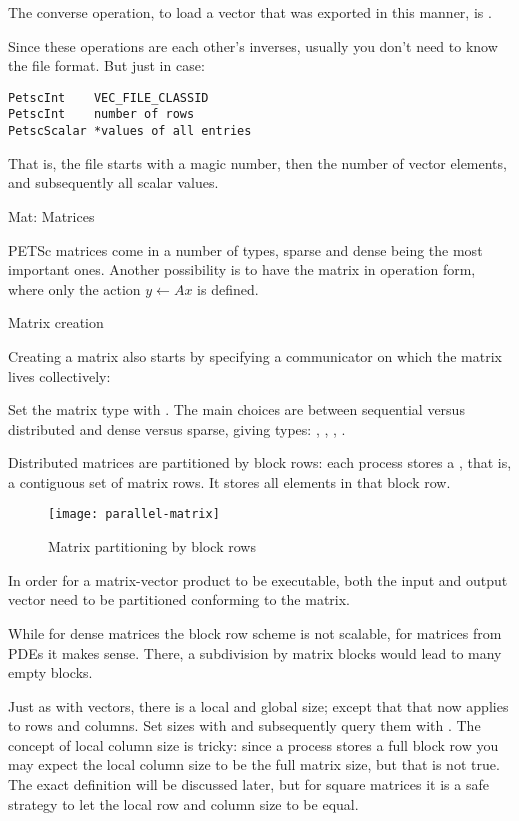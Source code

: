 The converse operation, to load a vector that was exported in this manner,
is .

Since these operations are each other's inverses,
usually you don't need to know the file format.
But just in case:
\begin{lstlisting}
PetscInt    VEC_FILE_CLASSID
PetscInt    number of rows
PetscScalar *values of all entries
\end{lstlisting}
That is, the file starts with a magic number, then the number of vector elements,
and subsequently all scalar values.

 {Mat: Matrices}

PETSc matrices come in a number of types, sparse and dense being the
most important ones. Another possibility is to have the matrix in
operation form, where only the action $y\leftarrow Ax$ is defined.

 {Matrix creation}
\label{sec:petscmat-create}

Creating a matrix also starts by specifying a communicator on which
the matrix lives collectively:
%

Set the matrix type with .  The main choices
are between sequential versus distributed and dense versus sparse,
giving types: , ,
, .

Distributed matrices are partitioned by block rows: each process
stores a , that is, a contiguous set of matrix
rows. It stores all elements in that block row.
%
\begin{figure}[ht]
  \texttt{[image: parallel-matrix]}
  \caption{Matrix partitioning by block rows}
  \label{fig:parallel-matrix}
\end{figure}
%
In order for a matrix-vector product to be executable, both the input
and output vector need to be partitioned conforming to the matrix.

While for dense matrices the block row scheme is not scalable, for
matrices from \acp{PDE} it makes sense. There, a subdivision by matrix
blocks would lead to many empty blocks.

Just as with vectors, there is a local and global size; except that
that now applies to rows and columns.
Set sizes with
and subsequently query them with
.
The concept of local column size is tricky:
since a process stores a full block row you may expect the local column size
to be the full matrix size, but that is not true.
The exact definition will be discussed later, but for square matrices it is a safe
strategy to let the local row and column size to be equal.

